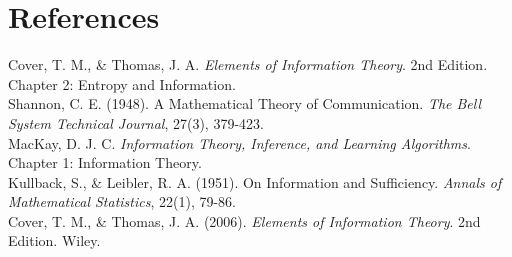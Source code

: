 \documentclass[a4paper]{article}
\begin{document}
\section{References}
Cover, T. M., \& Thomas, J. A. \textit{Elements of Information Theory}. 2nd Edition. Chapter 2: Entropy and Information.\\
Shannon, C. E. (1948). A Mathematical Theory of Communication. \textit{The Bell System Technical Journal}, 27(3), 379-423.\\
MacKay, D. J. C. \textit{Information Theory, Inference, and Learning Algorithms}. Chapter 1: Information Theory.\\
Kullback, S., \& Leibler, R. A. (1951). On Information and Sufficiency. \textit{Annals of Mathematical Statistics}, 22(1), 79-86.\\
Cover, T. M., \& Thomas, J. A. (2006). \textit{Elements of Information Theory}. 2nd Edition. Wiley.
\end{document}
